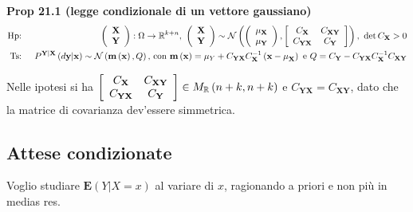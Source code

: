 \documentclass{article}
\begin{document}
\textbf{Prop 21.1 (legge condizionale di un vettore gaussiano)}%
\begin{eqnarray*}
\text{Hp}\text{: } &&\left( 
\begin{array}{c}
\mathbf{X} \\ 
\mathbf{Y}%
\end{array}%
\right) :\Omega \rightarrow 
\mathbb{R}
^{k+n}\text{, }\left( 
\begin{array}{c}
\mathbf{X} \\ 
\mathbf{Y}%
\end{array}%
\right) \sim \mathcal{N}\left( \left( 
\begin{array}{c}
\mathbf{\mu }_{\mathbf{X}} \\ 
\mathbf{\mu }_{\mathbf{Y}}%
\end{array}%
\right) ,\left[ 
\begin{array}{cc}
C_{\mathbf{X}} & C_{\mathbf{XY}} \\ 
C_{\mathbf{YX}} & C_{\mathbf{Y}}%
\end{array}%
\right] \right) \text{, }\det C_{\mathbf{X}}>0 \\
\text{Ts}\text{: } &&P^{\mathbf{Y|X}}\left( d\mathbf{y|x}\right) \sim 
\mathcal{N}\left( \mathbf{m}\left( \mathbf{x}\right) ,Q\right) \text{, con }%
\mathbf{m}\left( \mathbf{x}\right) =\mathbf{\mu }_{Y}+C_{\mathbf{YX}}C_{%
\mathbf{X}}^{-1}\left( \mathbf{x-\mu }_{\mathbf{X}}\right) \text{ e }Q=C_{%
\mathbf{Y}}-C_{\mathbf{YX}}C_{\mathbf{X}}^{-1}C_{\mathbf{XY}}
\end{eqnarray*}

Nelle ipotesi si ha $\left[ 
\begin{array}{cc}
C_{\mathbf{X}} & C_{\mathbf{XY}} \\ 
C_{\mathbf{YX}} & C_{\mathbf{Y}}%
\end{array}%
\right] \in M_{%
\mathbb{R}
}\left( n+k,n+k\right) $ e $C_{\mathbf{YX}}=C_{\mathbf{XY}}$, dato che la
matrice di covarianza dev'essere simmetrica.

\subsection{Attese condizionate}

Voglio studiare $\mathbf{E}\left( Y|X=x\right) $ al variare di $x$,
ragionando a priori e non pi\`{u} in medias res.
\end{document}
